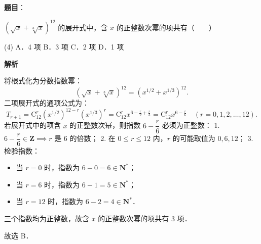 \begin{answer}

\textbf{题目}：

$(\sqrt{x} + \sqrt[3]{x})^{12}$ 的展开式中，含 $x$ 的正整数次幂的项共有\mbox{（　　）}

\begin{gkopts}(4)
\task A．4 项
\task B．3 项
\task C．2 项
\task D．1 项
\end{gkopts}

\textbf{解析}

将根式化为分数指数幂：
\nopagebreak[4]
\[
\left(\sqrt{x} + \sqrt[3]{x}\right)^{12} = \left(x^{1/2} + x^{1/3}\right)^{12}.
\]
二项展开式的通项公式为：
\nopagebreak[4]
\[
T_{r+1} = \mathrm{C}_{12}^r \left(x^{1/2}\right)^{12-r} \left(x^{1/3}\right)^r = \mathrm{C}_{12}^r x^{6 - \frac{r}{2} + \frac{r}{3}} = \mathrm{C}_{12}^r x^{6 - \frac{r}{6}} \quad (r = 0, 1, 2, \dots, 12).
\]
若展开式中的项含 $x$ 的正整数次幂，则指数 $6 - \dfrac{r}{6}$ 必须为正整数：
1. $6 - \dfrac{r}{6} \in \mathbf{Z} \implies r$ 是 $6$ 的倍数；
2. 在 $0 \leqslant r \leqslant 12$ 内，$r$ 的可能取值为 $0, 6, 12$；
3. 检验指数：
\begin{itemize}
\item 当 $r = 0$ 时，指数为 $6 - 0 = 6 \in \mathbf{N}^*$；
\item 当 $r = 6$ 时，指数为 $6 - 1 = 5 \in \mathbf{N}^*$；
\item 当 $r = 12$ 时，指数为 $6 - 2 = 4 \in \mathbf{N}^*$．
\end{itemize}
三个指数均为正整数，故含 $x$ 的正整数次幂的项共有 $3$ 项．

故选 B．


\end{answer}
